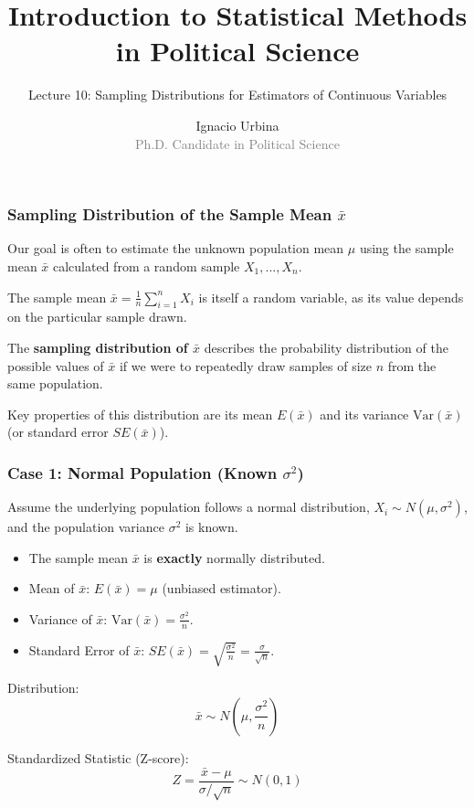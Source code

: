 \documentclass[handout]{beamer} %
\title{Introduction to Statistical Methods in Political Science}
\subtitle{Lecture 10: Sampling Distributions for Estimators of Continuous Variables}
\author{Ignacio Urbina \texorpdfstring{\\ \vspace{0.3em}}{ } \scriptsize \textcolor{gray}{Ph.D. Candidate in Political Science}}
\date{}
\begin{document}
\frame{\titlepage}


\begin{frame}
\frametitle{Sampling Distribution of the Sample Mean \(\bar{x}\)}
Our goal is often to estimate the unknown population mean \(\mu\) using the sample mean \(\bar{x}\) calculated from a random sample \(X_1, ..., X_n\).

\pause
The sample mean \(\bar{x} = \frac{1}{n}\sum_{i=1}^{n} X_i\) is itself a random variable, as its value depends on the particular sample drawn.

\pause
The \textbf{sampling distribution of \(\bar{x}\)} describes the probability distribution of the possible values of \(\bar{x}\) if we were to repeatedly draw samples of size \(n\) from the same population.

\pause
Key properties of this distribution are its mean \(E(\bar{x})\) and its variance \(\text{Var}(\bar{x})\) (or standard error \(SE(\bar{x})\)).
\end{frame}

\begin{frame}
\frametitle{Case 1: Normal Population (Known \(\sigma^2\))} %
Assume the underlying population follows a normal distribution, \(X_i \sim N(\mu, \sigma^2)\), and the population variance \(\sigma^2\) is known.

\pause
\begin{itemize}
    \item The sample mean \(\bar{x}\) is \textbf{exactly} normally distributed.
    \item Mean of \(\bar{x}\): \(E(\bar{x}) = \mu\) (unbiased estimator).
    \item Variance of \(\bar{x}\): \(\text{Var}(\bar{x}) = \frac{\sigma^2}{n}\).
    \item Standard Error of \(\bar{x}\): \(SE(\bar{x}) = \sqrt{\frac{\sigma^2}{n}} = \frac{\sigma}{\sqrt{n}}\).
\end{itemize}

\pause
Distribution:
\[
\bar{x} \sim N\left(\mu, \frac{\sigma^2}{n}\right)
\]

\pause
Standardized Statistic (Z-score):
\[
Z = \frac{\bar{x} - \mu}{\sigma/\sqrt{n}} \sim N(0, 1)
\]
\end{frame}
\end{document}
